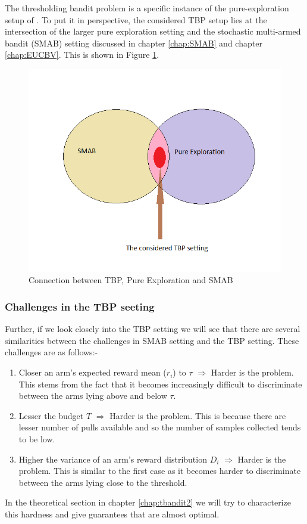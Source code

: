 The thresholding bandit problem is a specific instance of the pure-exploration setup of \citet{chen2014combinatorial}. To put it in perspective, the considered TBP setup lies at the intersection of the larger pure exploration setting and the stochastic multi-armed bandit (SMAB) setting discussed in chapter \ref{chap:SMAB} and chapter \ref{chap:EUCBV}. This is shown in Figure \ref{fig:con}.

\begin{figure}[!th]
\includegraphics[scale=0.7]{Chapter4/img/connection_TBP.png}
\caption{Connection between TBP, Pure Exploration and SMAB}
\label{fig:con}
\end{figure}

\subsubsection{Challenges in the TBP seeting}

Further, if we look closely into the TBP setting we will see that there are several similarities between the challenges in SMAB setting and the TBP setting. These challenges are as follows:-

\begin{enumerate}
\item Closer an arm’s expected reward mean ($r_i$) to $\tau$ $\Rightarrow$ Harder is the problem. This stems from the fact that it becomes increasingly difficult to discriminate between the arms lying above and below $\tau$.
\item Lesser the budget $T$ $\Rightarrow$ Harder is the problem. This is because there are lesser number of pulls available and so the number of samples collected tends to be low.
\item Higher the variance of an arm’s reward distribution $D_i$ $\Rightarrow$ Harder is the problem. This is similar to the first case as it becomes harder to discriminate between the arms lying close to the threshold.
\end{enumerate}

In the theoretical section in chapter \ref{chap:tbandit2} we will try to characterize this hardness and give guarantees that are almost optimal.